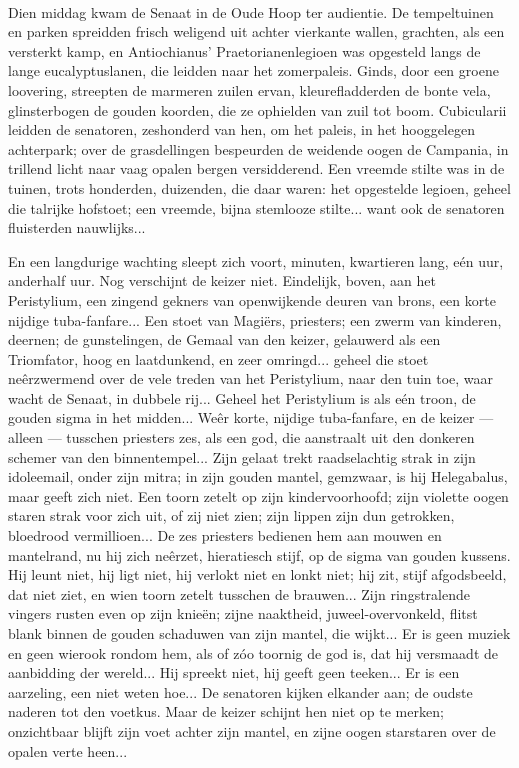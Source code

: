 \documentclass[a4paper, 12pt, oneside, dutch]{article}
\begin{document}
\paragraph{}
Dien middag kwam de Senaat in de Oude Hoop ter audientie. De tempeltuinen en parken spreidden frisch weligend uit achter vierkante wallen, grachten, als een versterkt kamp, en Antiochianus' Praetorianenlegioen was opgesteld langs de lange eucalyptuslanen, die leidden naar het zomerpaleis. Ginds, door een groene loovering, streepten de marmeren zuilen ervan, kleurefladderden de bonte vela, glinsterbogen de gouden koorden, die ze ophielden van zuil tot boom. Cubicularii leidden de senatoren, zeshonderd van hen, om het paleis, in het hooggelegen achterpark; over de grasdellingen bespeurden de weidende oogen de Campania, in trillend licht naar vaag opalen bergen versidderend. Een vreemde stilte was in de tuinen, trots honderden, duizenden, die daar waren: het opgestelde legioen, geheel die talrijke hofstoet; een vreemde, bijna stemlooze stilte... want ook de senatoren fluisterden nauwlijks...

En een langdurige wachting sleept zich voort, minuten, kwartieren lang, eén uur, anderhalf uur. Nog verschijnt de keizer niet. Eindelijk, boven, aan het Peristylium, een zingend gekners van openwijkende deuren van brons, een korte nijdige tuba-fanfare... Een stoet van Magiërs, priesters; een zwerm van kinderen, deernen; de gunstelingen, de Gemaal van den keizer, gelauwerd als een Triomfator, hoog en laatdunkend, en zeer omringd... geheel die stoet neêrzwermend over de vele treden van het Peristylium, naar den tuin toe, waar wacht de Senaat, in dubbele rij... Geheel het Peristylium is als eén troon, de gouden sigma in het midden... Weêr korte, nijdige tuba-fanfare, en de keizer --- alleen --- tusschen priesters zes, als een god, die aanstraalt uit den donkeren schemer van den binnentempel... Zijn gelaat trekt raadselachtig strak in zijn idoleemail, onder zijn mitra; in zijn gouden mantel, gemzwaar, is hij Helegabalus, maar geeft zich niet. Een toorn zetelt op zijn kindervoorhoofd; zijn violette oogen staren strak voor zich uit, of zij niet zien; zijn lippen zijn dun getrokken, bloedrood vermillioen... De zes priesters bedienen hem aan mouwen en mantelrand, nu hij zich neêrzet, hieratiesch stijf, op de sigma van gouden kussens. Hij leunt niet, hij ligt niet, hij verlokt niet en lonkt niet; hij zit, stijf afgodsbeeld, dat niet ziet, en wien toorn zetelt tusschen de brauwen... Zijn ringstralende vingers rusten even op zijn knieën; zijne naaktheid, juweel-overvonkeld, flitst blank binnen de gouden schaduwen van zijn mantel, die wijkt... Er is geen muziek en geen wierook rondom hem, als of zóo toornig de god is, dat hij versmaadt de aanbidding der wereld... Hij spreekt niet, hij geeft geen teeken... Er is een aarzeling, een niet weten hoe... De senatoren kijken elkander aan; de oudste naderen tot den voetkus. Maar de keizer schijnt hen niet op te merken; onzichtbaar blijft zijn voet achter zijn mantel, en zijne oogen starstaren over de opalen verte heen...
\end{document}
